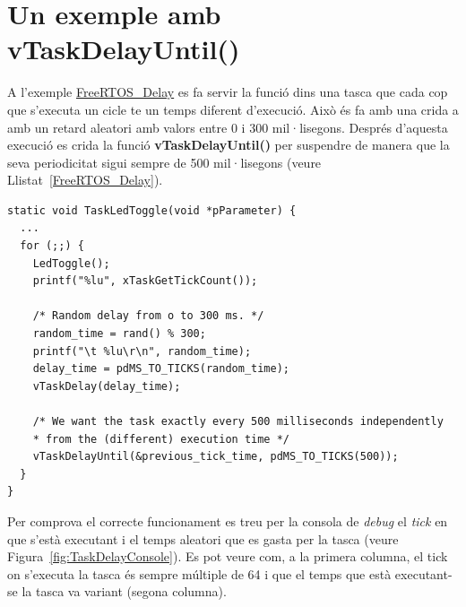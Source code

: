 \section{Un exemple amb vTaskDelayUntil()}

A l'exemple \href{https://github.com/mariusmm/cursembedded/tree/master/Simplicity/FreeRTOS_Delay}{FreeRTOS\_Delay} es fa servir la funció  dins una tasca que cada cop que s'executa un cicle te un temps diferent d'execució. Això és fa amb una crida a  amb un retard aleatori amb valors entre 0 i 300 mil·lisegons. 
Després d'aquesta execució es crida la funció {\bf vTaskDelayUntil()} per suspendre de manera que la seva periodicitat sigui sempre de 500 mil·lisegons (veure Llistat~\ref{FreeRTOS_Delay}). 


\begin{lstlisting}[style=customc, label=FreeRTOS_Delay, caption=Tasca de l'exemple FreeRTOS\_Delay]
static void TaskLedToggle(void *pParameter) {
  ...
  for (;;) {
    LedToggle();
    printf("%lu", xTaskGetTickCount());

    /* Random delay from o to 300 ms. */
    random_time = rand() % 300;
    printf("\t %lu\r\n", random_time);
    delay_time = pdMS_TO_TICKS(random_time);
    vTaskDelay(delay_time);

    /* We want the task exactly every 500 milliseconds independently
    * from the (different) execution time */
    vTaskDelayUntil(&previous_tick_time, pdMS_TO_TICKS(500));
  }
}
\end{lstlisting}

Per comprova el correcte funcionament es treu per la consola de {\em debug} el {\em tick} en que s'està executant i el temps aleatori que es gasta per la tasca (veure Figura~\ref{fig:TaskDelayConsole}). Es pot veure com, a la primera columna, el tick on s'executa la tasca és sempre múltiple de 64 i que el temps que està executant-se la tasca va variant (segona columna).


